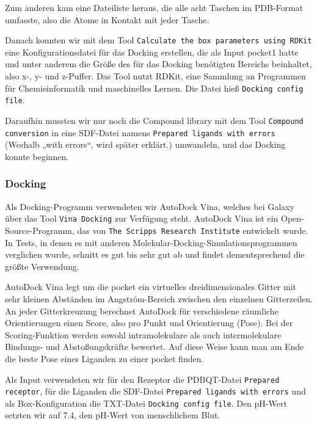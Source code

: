 \documentclass[10pt]{article}
\begin{document}
    Zum anderen kam eine Dateiliste heraus, die alle acht Taschen im PDB-Format umfasste, also die Atome in Kontakt mit
    jeder Tasche.

    Danach konnten wir mit dem Tool \texttt{Calculate the box parameters using RDKit} eine Konfigurationsdatei für
    das Docking
    erstellen, die als Input pocket1 hatte und unter anderem die Größe des für das Docking benötigten Bereichs
    beinhaltet, also x-, y- und z-Puffer.\cite{15} Das Tool nutzt RDKit, eine Sammlung an Programmen für
    Chemieinformatik und
    maschinelles Lernen.\cite{14} Die Datei hieß \texttt{Docking config file}.

    Daraufhin mussten wir nur noch die Compound library mit dem Tool \texttt{Compound conversion} in eine SDF-Datei
    namens
    \texttt{Prepared ligands with errors} (Weshalb „with errors“, wird später erklärt.) umwandeln, und das Docking
    konnte
    beginnen.

    \subsubsection{Docking}\label{subsubsec:docking}

    Als Docking-Programm verwendeten wir AutoDock Vina, welches bei Galaxy über das Tool \texttt{Vina Docking} zur
    Verfügung
    steht.\cite{20, 21} AutoDock Vina ist ein Open-Source-Programm, das von \texttt{The Scripps Research
    Institute} entwickelt
    wurde.\cite{29} In
    Tests, in denen es mit anderen Molekular-Docking-Simulationsprogrammen verglichen wurde, schnitt es gut bis sehr
    gut ab und findet dementsprechend die größte Verwendung.

    AutoDock Vina legt um die pocket ein virtuelles dreidimensionales Gitter mit sehr kleinen Abständen im
    Angström-Bereich zwischen den einzelnen Gitterzeilen. An jeder Gitterkreuzung berechnet AutoDock für verschiedene
    räumliche Orientierungen einen Score, also pro Punkt und Orientierung (Pose). Bei der Scoring-Funktion werden
    sowohl intramolekulare als auch intermolekulare Bindungs- und Abstoßungskräfte bewertet. Auf diese Weise kann man
    am Ende die beste Pose eines Liganden zu einer pocket finden.

    Als Input verwendeten wir für den Rezeptor die PDBQT-Datei \texttt{Prepared receptor}, für die Liganden die
    SDF-Datei
    \texttt{Prepared ligands with errors} und als Box-Konfiguration die TXT-Datei \texttt{Docking config file}. Den
    pH-Wert setzten
    wir auf 7.4, den pH-Wert von menschlichem Blut.
\end{document}
